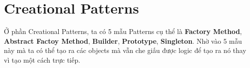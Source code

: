 \section{Creational Patterns}
Ở phần Creational Patterns, ta có 5 mẫu Patterns cụ thể là \textbf{Factory Method}, \textbf{Abstract Factoy Method}, \textbf{Builder}, \textbf{Prototype}, \textbf{Singleton}. Nhờ vào 5 mẫu này mà ta có thể tạo ra các objects mà vẫn che giấu được logic để tạo ra nó thay vì tạo một cách trực tiếp.\\




